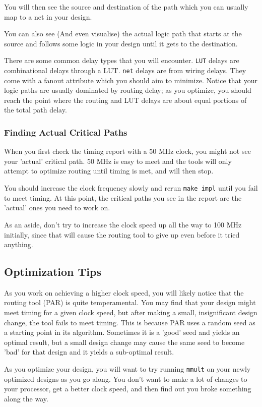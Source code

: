 \documentclass[11pt]{article}
\begin{document}
You will then see the source and destination of the path which you can usually map to a net in your design.

You can also see (And even visualise) the actual logic path that starts at the source and follows some logic in your design until it gets to the destination.

There are some common delay types that you will encounter.
\verb|LUT| delays are combinational delays through a LUT.
\verb|net| delays are from wiring delays. They come with a fanout attribute which you should aim to minimize.
Notice that your logic paths are usually dominated by routing delay; as you optimize, you should reach the point where the routing and LUT delays are about equal portions of the total path delay.

\subsubsection{Finding Actual Critical Paths}
When you first check the timing report with a 50 MHz clock, you might not see your 'actual' critical path.
50 MHz is easy to meet and the tools will only attempt to optimize routing until timing is met, and will then stop.

You should increase the clock frequency slowly and rerun \verb|make impl| until you fail to meet timing.
At this point, the critical paths you see in the report are the 'actual' ones you need to work on.

As an aside, don't try to increase the clock speed up all the way to 100 MHz initially, since that will cause the routing tool to give up even before it tried anything.

\subsection{Optimization Tips}
As you work on achieving a higher clock speed, you will likely notice that the routing tool (PAR) is quite temperamental. You may find that your design might meet timing for a given clock speed, but after making a small, insignificant design change, the tool fails to meet timing. This is because PAR uses a random seed as a starting point in its algorithm. Sometimes it is a 'good' seed and yields an optimal result, but a small design change may cause the same seed to become 'bad' for that design and it yields a sub-optimal result.

As you optimize your design, you will want to try running \verb|mmult| on your newly optimized designs as you go along. You don't want to make a lot of changes to your processor, get a better clock speed, and then find out you broke something along the way.
\end{document}
